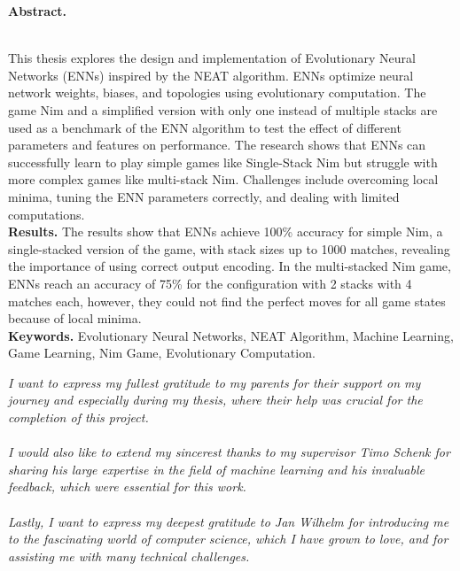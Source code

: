 \documentclass[12pt]{report}
\begin{document}
    \begin{doublespace}
        \begin{center}
            \textbf{Abstract.}
        \end{center}
        \\
        This thesis explores the design and implementation of Evolutionary Neural Networks (ENNs) inspired by the NEAT algorithm.
        ENNs optimize neural network weights, biases, and topologies using evolutionary computation.
        The game Nim and a simplified version with only one instead of multiple stacks are used as a benchmark of the ENN algorithm to test the effect of different parameters and features on performance.
        The research shows that ENNs can successfully learn to play simple games like Single-Stack Nim but struggle with more complex games like multi-stack Nim.
        Challenges include overcoming local minima, tuning the ENN parameters correctly, and dealing with limited computations.
        \\
        \textbf{Results.}
        The results show that ENNs achieve 100\% accuracy for simple Nim, a single-stacked version of the game, with stack sizes up to 1000 matches, revealing the importance of using correct output encoding.
        In the multi-stacked Nim game, ENNs reach an accuracy of 75\% for the configuration with 2 stacks with 4 matches each, however, they could not find the perfect moves for all game states because of local minima.
        \\
        \textbf{Keywords.}
        Evolutionary Neural Networks, NEAT Algorithm, Machine Learning, Game Learning, Nim Game, Evolutionary Computation.

        \newpage
        \vspace*{5em}
        \begin{adjustwidth}{2cm}{2cm}
            \textit{
                I want to express my fullest gratitude to my parents for their support on my journey and especially during my thesis, where their help was crucial for the completion of this project.
                \\ \\
                I would also like to extend my sincerest thanks to my supervisor Timo Schenk for sharing his large expertise in the field of machine learning and his invaluable feedback, which were essential for this work.
                \\ \\
                Lastly, I want to express my deepest gratitude to Jan Wilhelm for introducing me to the fascinating world of computer science, which I have grown to love, and for assisting me with many technical challenges.
            }
        \end{adjustwidth}
    \end{doublespace}
    \newpage
\end{document}
